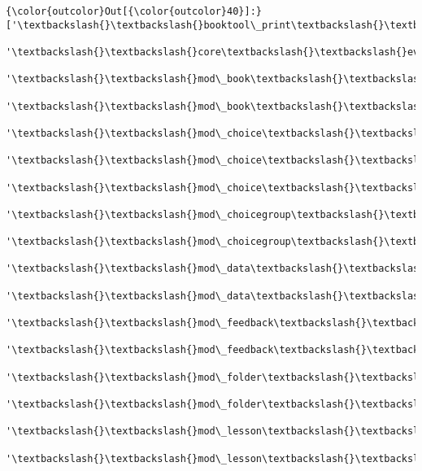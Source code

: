 \documentclass[11pt]{article}
\begin{document}
\begin{Verbatim}[commandchars=\\\{\}]
{\color{outcolor}Out[{\color{outcolor}40}]:} ['\textbackslash{}\textbackslash{}booktool\_print\textbackslash{}\textbackslash{}event\textbackslash{}\textbackslash{}book\_printed',
          '\textbackslash{}\textbackslash{}core\textbackslash{}\textbackslash{}event\textbackslash{}\textbackslash{}course\_viewed',
          '\textbackslash{}\textbackslash{}mod\_book\textbackslash{}\textbackslash{}event\textbackslash{}\textbackslash{}chapter\_viewed',
          '\textbackslash{}\textbackslash{}mod\_book\textbackslash{}\textbackslash{}event\textbackslash{}\textbackslash{}course\_module\_viewed',
          '\textbackslash{}\textbackslash{}mod\_choice\textbackslash{}\textbackslash{}event\textbackslash{}\textbackslash{}answer\_submitted',
          '\textbackslash{}\textbackslash{}mod\_choice\textbackslash{}\textbackslash{}event\textbackslash{}\textbackslash{}answer\_updated',
          '\textbackslash{}\textbackslash{}mod\_choice\textbackslash{}\textbackslash{}event\textbackslash{}\textbackslash{}course\_module\_viewed',
          '\textbackslash{}\textbackslash{}mod\_choicegroup\textbackslash{}\textbackslash{}event\textbackslash{}\textbackslash{}choice\_updated',
          '\textbackslash{}\textbackslash{}mod\_choicegroup\textbackslash{}\textbackslash{}event\textbackslash{}\textbackslash{}course\_module\_viewed',
          '\textbackslash{}\textbackslash{}mod\_data\textbackslash{}\textbackslash{}event\textbackslash{}\textbackslash{}course\_module\_viewed',
          '\textbackslash{}\textbackslash{}mod\_data\textbackslash{}\textbackslash{}event\textbackslash{}\textbackslash{}record\_created',
          '\textbackslash{}\textbackslash{}mod\_feedback\textbackslash{}\textbackslash{}event\textbackslash{}\textbackslash{}course\_module\_viewed',
          '\textbackslash{}\textbackslash{}mod\_feedback\textbackslash{}\textbackslash{}event\textbackslash{}\textbackslash{}response\_submitted',
          '\textbackslash{}\textbackslash{}mod\_folder\textbackslash{}\textbackslash{}event\textbackslash{}\textbackslash{}all\_files\_downloaded',
          '\textbackslash{}\textbackslash{}mod\_folder\textbackslash{}\textbackslash{}event\textbackslash{}\textbackslash{}course\_module\_viewed',
          '\textbackslash{}\textbackslash{}mod\_lesson\textbackslash{}\textbackslash{}event\textbackslash{}\textbackslash{}content\_page\_viewed',
          '\textbackslash{}\textbackslash{}mod\_lesson\textbackslash{}\textbackslash{}event\textbackslash{}\textbackslash{}lesson\_started',

\end{Verbatim}
\end{document}
